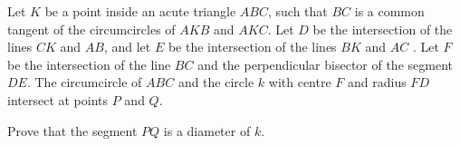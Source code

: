 Let $K$ be a point inside an acute triangle $ ABC $,  such that $ BC $ is a common tangent of the circumcircles of $ AKB $ and $ AKC$. Let $ D $ be the intersection of the lines $ CK $ and $ AB $,  and let $ E $ be the intersection of the lines $ BK $ and $ AC $ . Let $ F $ be the intersection of the line $BC$ and the perpendicular bisector of the segment $DE$. The circumcircle of $ABC$ and the circle $k$ with centre $ F$ and radius $FD$ intersect at points $P$ and $Q$.

Prove that the segment $PQ$ is a diameter of $k$.